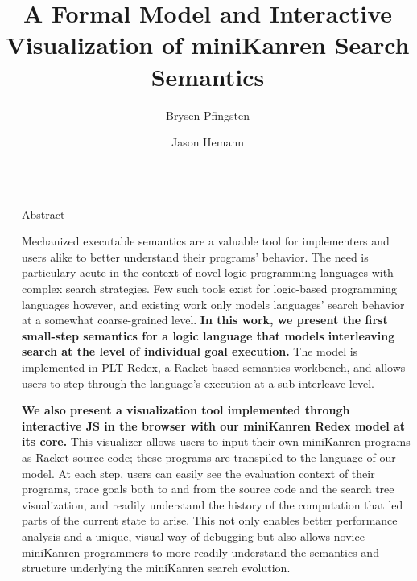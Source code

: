 \documentclass[final]{beamer}
\title{A Formal Model and Interactive Visualization of miniKanren Search Semantics}
\author{Brysen Pfingsten \and Jason Hemann}
\newlength{\sepwidth}
\newlength{\colwidth}
\newcommand{\separatorcolumn}{\begin{column}{\sepwidth}\end{column}}
\begin{document}


\begin{frame}[t]
\begin{columns}[t]
\separatorcolumn


\begin{column}{\colwidth}


  \begin{block}{Abstract}

Mechanized executable semantics are a valuable tool for implementers and users alike to better understand their programs' behavior. 
The need is particulary acute in the context of novel logic programming languages with complex search strategies. 
Few such tools exist for logic-based programming languages however, and existing work only models languages' search behavior at a somewhat coarse-grained level.
\textbf{In this work, we present the first small-step semantics for a logic language that models interleaving search at the level of individual goal execution.}
 The model is implemented in PLT Redex, a Racket-based semantics workbench, and allows users to step through the language's execution at a sub-interleave level.

\textbf{We also present a visualization tool implemented through interactive JS in the browser with our miniKanren Redex model at its core.}
This visualizer allows users to input their own miniKanren programs as Racket source code; these programs are transpiled to the language of our model. 
At each step, users can easily see the evaluation context of their programs, trace goals both to and from the source code and the search tree visualization, and readily understand the history of the computation that led parts of the current state to arise. 
This not only enables better performance analysis and a unique, visual way of debugging but also allows novice miniKanren programmers to more readily understand the semantics and structure underlying the miniKanren search evolution.

  \end{block}
  
  

\end{column}
\end{columns}
\end{frame}
\end{document}
